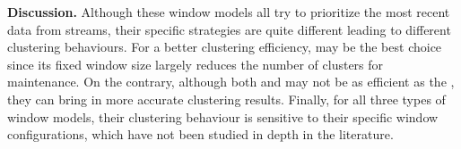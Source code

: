 
\textbf{Discussion.}
Although these window models all try to prioritize the most recent data from streams, their specific strategies are quite different leading to different clustering behaviours. For a better clustering efficiency, \sliding may be the best choice since its fixed window size largely reduces the number of clusters for maintenance. On the contrary, although both \landmark and \damped may not be as efficient as the \sliding, they can bring in more accurate clustering results. Finally, for all three types of window models, their clustering behaviour is sensitive to their specific window configurations, which have not been studied in depth in the literature.

